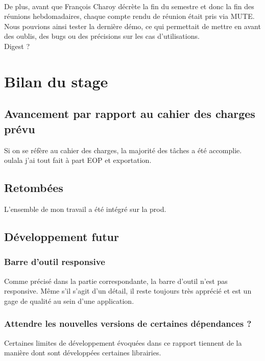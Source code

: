\documentclass[12pt]{article}
\begin{document}
\paragraph{}
De plus, avant que François Charoy décrète la fin du semestre et donc la fin des réunions hebdomadaires, chaque compte rendu de réunion était pris via MUTE. Nous pouvions ainsi tester la dernière démo, ce qui permettait de mettre en avant des oublis, des bugs ou des précisions sur les cas d'utilisations.\\

Digest ?

\newpage
\section{Bilan du stage}
\subsection{Avancement par rapport au cahier des charges prévu}
Si on se réfère au cahier des charges, la majorité des tâches a été accomplie.
oulala j'ai tout fait à part EOP et exportation. 

\subsection{Retombées}
L'ensemble de mon travail a été intégré sur la prod.

\subsection{Développement futur}
\subsubsection{Barre d'outil responsive}
Comme précisé dans la partie correspondante, la barre d'outil n'est pas responsive. Même s'il s'agit d'un détail, il reste toujours très apprécié et est un gage de qualité au sein d'une application.

\subsubsection{Attendre les nouvelles versions de certaines dépendances ?}
Certaines limites de développement évoquées dans ce rapport tiennent de la manière dont sont développées certaines librairies.
\end{document}
